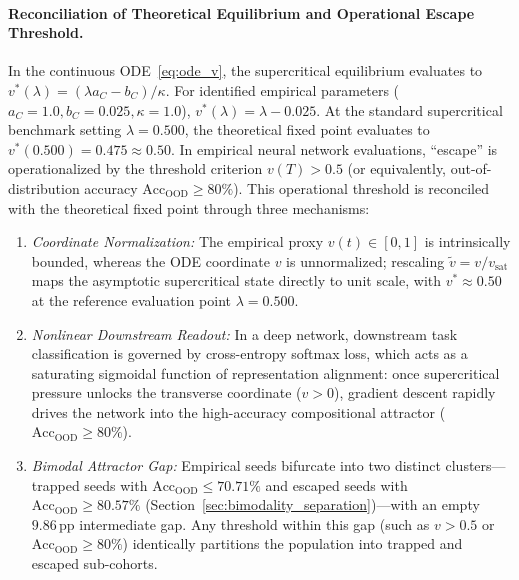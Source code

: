 \documentclass{article}
\theoremstyle{plain}
\theoremstyle{definition}
\begin{document}
\paragraph{Reconciliation of Theoretical Equilibrium and Operational Escape Threshold.}
In the continuous ODE~\eqref{eq:ode_v}, the supercritical equilibrium evaluates to $v^*(\lambda) = (\lambda a_C - b_C) / \kappa$. For identified empirical parameters ($a_C = 1.0, b_C = 0.025, \kappa = 1.0$), $v^*(\lambda) = \lambda - 0.025$. At the standard supercritical benchmark setting $\lambda = 0.500$, the theoretical fixed point evaluates to $v^*(0.500) = 0.475 \approx 0.50$. In empirical neural network evaluations, ``escape'' is operationalized by the threshold criterion $v(T) > 0.5$ (or equivalently, out-of-distribution accuracy $\text{Acc}_{\text{OOD}} \ge 80\%$). This operational threshold is reconciled with the theoretical fixed point through three mechanisms:
\begin{enumerate}[label=(\alph*),leftmargin=*]
    \item \emph{Coordinate Normalization:} The empirical proxy $v(t) \in [0, 1]$ is intrinsically bounded, whereas the ODE coordinate $v$ is unnormalized; rescaling $\tilde{v} = v / v_{\text{sat}}$ maps the asymptotic supercritical state directly to unit scale, with $v^* \approx 0.50$ at the reference evaluation point $\lambda = 0.500$.
    \item \emph{Nonlinear Downstream Readout:} In a deep network, downstream task classification is governed by cross-entropy softmax loss, which acts as a saturating sigmoidal function of representation alignment: once supercritical pressure unlocks the transverse coordinate ($v > 0$), gradient descent rapidly drives the network into the high-accuracy compositional attractor ($\text{Acc}_{\text{OOD}} \ge 80\%$).
    \item \emph{Bimodal Attractor Gap:} Empirical seeds bifurcate into two distinct clusters---trapped seeds with $\text{Acc}_{\text{OOD}} \le 70.71\%$ and escaped seeds with $\text{Acc}_{\text{OOD}} \ge 80.57\%$ (Section~\ref{sec:bimodality_separation})---with an empty $9.86\,\text{pp}$ intermediate gap. Any threshold within this gap (such as $v > 0.5$ or $\text{Acc}_{\text{OOD}} \ge 80\%$) identically partitions the population into trapped and escaped sub-cohorts.
\end{enumerate}
\end{document}
